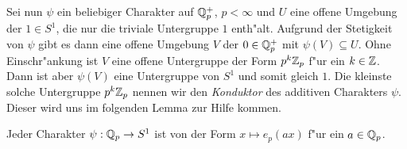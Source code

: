 		Sei nun $\psi$ ein beliebiger Charakter auf $\mathbb{Q}_p^+$, $p<\infty$ und $U$ eine offene Umgebung der $1 \in S^1$, die nur die triviale Untergruppe $1$ enth"alt. 
		Aufgrund der Stetigkeit von $\psi$ gibt es dann eine offene Umgebung $V$ der $0\in\mathbb{Q}_p^+$ mit $\psi(V)\subseteq U$. 
		Ohne Einschr"ankung ist $V$ eine offene Untergruppe der Form $p^k{\mathbb{Z}_p}$ f"ur ein $k\in\mathbb{Z}$. 
		Dann ist aber $\psi(V)$ eine Untergruppe von $S^1$ und somit gleich $1$.
		Die kleinste solche Untergruppe $p^k{\mathbb{Z}_p}$ nennen wir den \emph{Konduktor} des additiven Charakters $\psi$. %
		Dieser wird uns im folgenden Lemma zur Hilfe kommen.
	
		\begin{lemma}
			Jeder Charakter $\psi: {\mathbb{Q}_p} \to S^1$ ist von der Form $x \mapsto e_p(ax)$ f"ur ein $a \in {\mathbb{Q}_p}$.
		\end{lemma}
